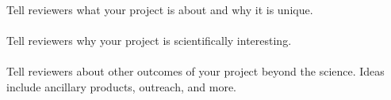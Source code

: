 
\\

\noindent Tell reviewers what your project is about and why it is unique.\\

\\

\noindent Tell reviewers why your project is scientifically interesting.\\

\\

\noindent Tell reviewers about other outcomes of your project beyond the science. Ideas include ancillary products, outreach, and more.
